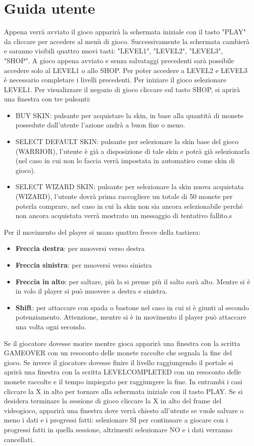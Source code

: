 \documentclass[a4paper,12pt]{report}
\begin{document}
\chapter{Guida utente}
Appena verrà avviato il gioco apparirà la schermata iniziale con il tasto "PLAY" da cliccare per accedere al menù di gioco.
Successivamente la schermata cambierà e saranno visibili quattro nuovi tasti: "LEVEL1", "LEVEL2", "LEVEL3", "SHOP". A gioco appena avviato e senza
salvataggi precedenti sarà possibile accedere solo al LEVEL1 o allo SHOP. Per poter accedere a LEVEL2 e LEVEL3 è necessario completare i livelli
precedenti. Per iniziare il gioco selezionare LEVEL1. Per visualizzare il negozio di gioco cliccare sul tasto SHOP, si aprirà una finestra con tre pulsanti:
\begin{itemize}
    \item BUY SKIN: pulsante per acquistare la skin, in base alla quantità di monete possedute dall'utente l'azione andrà a buon fine o meno.
    \item SELECT DEFAULT SKIN: pulsante per selezionare la skin base del gioco (WARRIOR), l'utente è già a disposizione di tale skin e potrà già selezionarla 
    (nel caso in cui non lo faccia verrà impostata in automatico come skin di gioco).
    \item SELECT WIZARD SKIN: pulsante per selezionare la skin nuova acquistata (WIZARD), l'utente dovrà prima raccogliere un totale di 50 monete per poterla 
    comprare, nel caso in cui la skin non sia ancora selezionabile perché non ancora acquistata verrà mostrato un messaggio di tentativo fallito.s
\end{itemize}
Per il movimento del player si usano quattro frecce della tastiera:
\begin{itemize}
    \item \textbf{Freccia destra}: per muoversi verso destra
    \item \textbf{Freccia sinistra}: per muoversi verso sinistra
    \item \textbf{Freccia in alto}: per saltare, più la si preme più il salto sarà alto.
    Mentre si è in volo il player si può muovere a destra e sinistra.
    \item \textbf{Shift}: per attaccare con spada o bastone nel caso in cui si è giunti al secondo potenziamento.
    Attenzione, mentre si è in movimento il player può attaccare una volta ogni secondo.
\end{itemize}
Se il giocatore dovesse morire mentre gioca apparirà una finestra con la scritta GAMEOVER con un resoconto delle monete raccolte che segnala la fine del gioco.
Se invece il giocatore dovesse finire il livello raggiungendo il portale si aprirà una finestra con la scritta LEVELCOMPLETED con un resoconto delle monete 
raccolte e il tempo impiegato per raggiungere la fine. 
In entrambi i casi cliccare la X in alto per tornare alla schermata iniziale con il tasto PLAY.
Se si desidera terminare la sessione di gioco cliccare la X in alto del frame del videogioco, apparirà una finestra dove verrà chiesto all'utente se vuole 
salvare o meno i dati e i progressi fatti: selezionare SI per continuare a giocare con i progressi fatti in quella sessione, altrimenti selezionare NO e i dati 
verranno cancellati.
\end{document}
